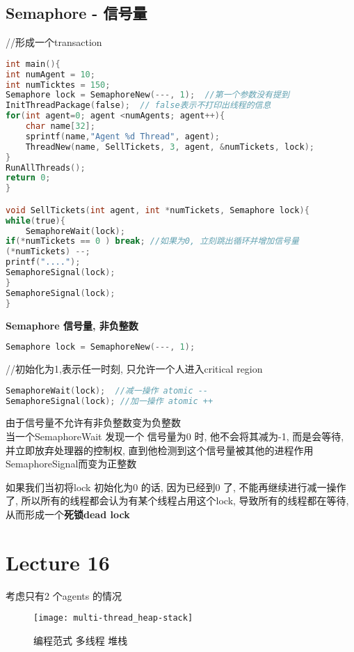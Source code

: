 \documentclass{article}
\begin{document}
\subsection{Semaphore - 信号量}
//形成一个transaction
\begin{lstlisting}[language = C]
int main(){
int numAgent = 10;
int numTicktes = 150;
Semaphore lock = SemaphoreNew(---, 1);  //第一个参数没有提到
InitThreadPackage(false);  // false表示不打印出线程的信息
for(int agent=0; agent <numAgents; agent++){
	char name[32];
	sprintf(name,"Agent %d Thread", agent);
	ThreadNew(name, SellTickets, 3, agent, &numTickets, lock);
}
RunAllThreads();
return 0;
}

void SellTickets(int agent, int *numTickets, Semaphore lock){
while(true){
	SemaphoreWait(lock);
if(*numTickets == 0 ) break; //如果为0, 立刻跳出循环并增加信号量
(*numTickets) --;
printf("....");
SemaphoreSignal(lock);
}
SemaphoreSignal(lock);
}
\end{lstlisting}

\textbf{Semaphore 信号量, 非负整数}
\begin{lstlisting}[language = C]
Semaphore lock = SemaphoreNew(---, 1);
\end{lstlisting}
//初始化为1,表示任一时刻, 只允许一个人进入critical region

\begin{lstlisting}[language = C]
SemaphoreWait(lock);  //减一操作 atomic --
SemaphoreSignal(lock); //加一操作 atomic ++
\end{lstlisting}
由于信号量不允许有非负整数变为负整数\\
当一个SemaphoreWait 发现一个 信号量为0 时, 他不会将其减为-1, 而是会等待, 并立即放弃处理器的控制权, 直到他检测到这个信号量被其他的进程作用SemaphoreSignal而变为正整数

如果我们当初将lock 初始化为0 的话, 因为已经到0 了, 不能再继续进行减一操作了, 所以所有的线程都会认为有某个线程占用这个lock, 导致所有的线程都在等待, 从而形成一个\textbf{死锁dead lock}

\section{Lecture 16}
考虑只有2 个agents 的情况
\begin{figure}[htbp]
	\centering
	\texttt{[image: multi-thread\_heap-stack]}\\
	\caption{编程范式 多线程 堆栈}\label{fig.multi-thread.heap-stack}
\end{figure}
\end{document}
